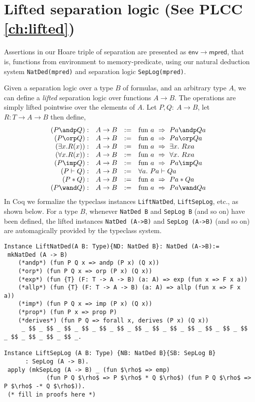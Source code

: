 \documentclass[12pt,fleqn,openany,oneside,showtrims]{memoir}
\newcommand{\ychapter}[2]{\chapter[#1]{#1 \hfill \normalsize #2}}
\begin{document}
\ychapter{Lifted separation logic}{(See PLCC \autoref{ch:lifted})}
Assertions in our Hoare triple of separation 
are presented as $\mathsf{env}\rightarrow
\mathsf{mpred}$, that is, functions from environment
to memory-predicate,
using our natural deduction system 
\lstinline{NatDed(mpred)} and separation logic
\lstinline{SepLog(mpred)}.

Given a separation logic over a type $B$ of formulas,
and an arbitrary type $A$, 
we can define a \emph{lifted} separation logic over functions $A \rightarrow B$.
The operations are simply lifted pointwise over the
elements of $A$.  Let $P,Q:~A\rightarrow B$,
let $R:T\rightarrow A \rightarrow B$ then define,
\[
\begin{array}{rccl}
(P \andp Q):& A\rightarrow B&:=& \mathrm{fun}~a~\Rightarrow~Pa \andp Qa\\
(P \orp Q):& A\rightarrow B&:=& \mathrm{fun}~a~\Rightarrow~Pa \orp Qa\\
(\exists x.R(x)):& A\rightarrow B&:=& \mathrm{fun}~a~\Rightarrow~\exists x.~Rxa\\
(\forall x.R(x)):& A\rightarrow B&:=& \mathrm{fun}~a~\Rightarrow~\forall x.~Rxa\\
(P \imp Q):& A\rightarrow B&:=& \mathrm{fun}~a~\Rightarrow~Pa \imp Qa\\
(P \vdash Q):& A\rightarrow B&:=& \forall a.~Pa \vdash Qa\\
(P * Q):& A\rightarrow B&:=& \mathrm{fun}~a~\Rightarrow~Pa * Qa\\
(P \wand Q):& A\rightarrow B&:=& \mathrm{fun}~a~\Rightarrow~Pa \wand Qa\\
\end{array}
\]
In Coq we formalize the typeclass instances
\lstinline{LiftNatDed},
\lstinline{LiftSepLog}, etc.,
as shown below.
For a type $B$, whenever \lstinline{NatDed B} and \lstinline{SepLog B} (and so on) have been defined, the lifted instances
\lstinline{NatDed (A->B)} and \lstinline{SepLog (A->B)} (and so on)
are automagically provided by the typeclass system.

\begin{lstlisting}
Instance LiftNatDed(A B: Type){ND: NatDed B}: NatDed (A->B):=
 mkNatDed (A -> B)
    (*andp*) (fun P Q x => andp (P x) (Q x))
    (*orp*) (fun P Q x => orp (P x) (Q x))
    (*exp*) (fun {T} (F: T -> A -> B) (a: A) => exp (fun x => F x a))
    (*allp*) (fun {T} (F: T -> A -> B) (a: A) => allp (fun x => F x a))
    (*imp*) (fun P Q x => imp (P x) (Q x))
    (*prop*) (fun P x => prop P)
    (*derives*) (fun P Q => forall x, derives (P x) (Q x))
     _ $$ _ $$ _ $$ _ $$ _ $$ _ $$ _ $$ _ $$ _ $$ _ $$ _ $$ _ $$ _ $$ _ $$ _ $$ _ $$ _ $$ _.

Instance LiftSepLog (A B: Type) {NB: NatDed B}{SB: SepLog B} 
      : SepLog (A -> B).
 apply (mkSepLog (A -> B) _ (fun $\rho$ => emp) 
            (fun P Q $\rho$ => P $\rho$ * Q $\rho$) (fun P Q $\rho$ => P $\rho$ -* Q $\rho$)).
 (* fill in proofs here *)
\end{lstlisting}
\end{document}

